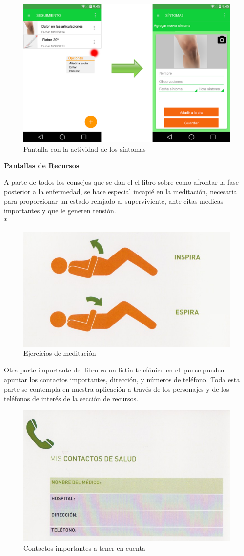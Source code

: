 \documentclass[../pfc.tex]{subfiles}
\begin{document}
		\begin{figure}[H]
			\centering
			\includegraphics[width=0.7\linewidth]{../images/sintomas}
			\caption{Pantalla con la actividad de los síntomas}
			\label{fig:sintomas}
		\end{figure}
		
		
		\textbf{Pantallas de Recursos}
		
		A parte de todos los consejos que se dan el el libro sobre como afrontar la fase posterior a la enfermedad, se hace especial incapié en la meditación, necesaria para proporcionar un estado relajado al superviviente, ante citas medicas importantes y que le generen tensión.\\*
		
		\begin{figure}[H]
			\centering
			\includegraphics[width=0.7\linewidth]{../folleto/008_corto}
			\caption{Ejercicios de meditación}
			\label{fig:meditacion}
		\end{figure}
		
		Otra parte importante del libro es un listín telefónico en el que se pueden apuntar los contactos importantes, dirección, y números de teléfono. Toda esta parte se contempla en nuestra aplicación a través de los personajes y de los teléfonos de interés de la sección de recursos. 
		
		\begin{figure}[H]
			\centering
			\includegraphics[width=0.5\linewidth]{../folleto/016_corto}
			\caption{Contactos importantes a tener en cuenta}
			\label{fig:contactos}
		\end{figure}
		
\end{document}
